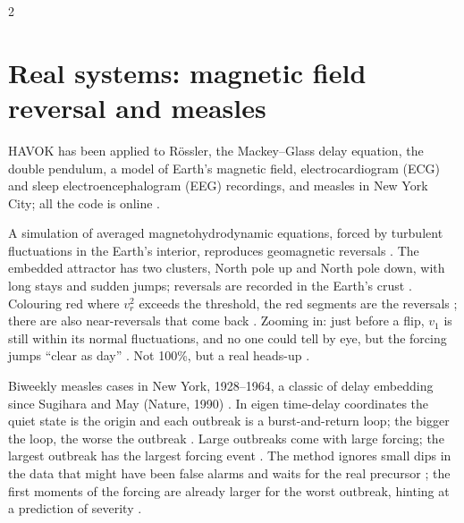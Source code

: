 \begin{paracol}{2}
\section{Real systems: magnetic field reversal and measles}\label{sec:hv-examples}

HAVOK has been applied to R\"ossler, the Mackey--Glass delay equation, the double pendulum, a model of Earth's magnetic field,
electrocardiogram (ECG) and sleep electroencephalogram (EEG) recordings, and measles in New York City; all the code is online
.

\begin{casestudy}
A simulation of averaged magnetohydrodynamic equations, forced by turbulent fluctuations in the Earth's interior, reproduces
geomagnetic reversals . The embedded attractor has two clusters, North pole up and
North pole down, with long stays and sudden jumps; reversals are recorded in the Earth's crust .
Colouring red where $v_r^2$ exceeds the threshold, the red segments are the reversals ; there are also near-reversals
that come back . Zooming in: just before a flip, $v_1$ is still within its normal fluctuations, and no one could tell
by eye, but the forcing jumps ``clear as day'' . Not 100\%, but a real heads-up
.
\end{casestudy}

\begin{casestudy}
Biweekly measles cases in New York, 1928--1964, a classic of delay embedding since Sugihara and May (Nature, 1990)
. In eigen time-delay coordinates the quiet state is the origin and each outbreak is a burst-and-return
loop; the bigger the loop, the worse the outbreak . Large outbreaks come with large forcing; the
largest outbreak has the largest forcing event . The method ignores small dips in the data that might have been
false alarms and waits for the real precursor ; the first moments of the forcing are already larger
for the worst outbreak, hinting at a prediction of severity .
\end{casestudy}


\end{paracol}
